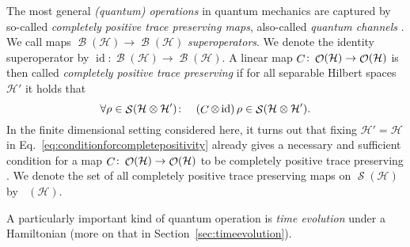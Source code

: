 \documentclass[a4paper,12pt,listof=totoc,index=totoc,bibliography=totoc,headsepline=false,headings=normal,BCOR16.153846mm,DIV12,headinclude,twoside,cleardoublepage=empty,numbers=noenddot,final]{scrreprt}
\theoremstyle{mystyle}
\numberwithin{equation}{section}
\numberwithin{figure}{section}
\numberwithin{lemma}{section}
\numberwithin{theorem}{section}
\numberwithin{corollary}{section}
\numberwithin{definition}{section}
\numberwithin{conjecture}{section}
\numberwithin{observation}{section}
\newcommand{\+}{\mkern2mu}
\newcommand{\texteqref}[1]{Eq.~\eqref{#1}}
\newcommand{\oftype}{\colon}
\newcommand{\itholds}{\colon\mathchoice{\quad}{}{}{}}
\DeclareMathOperator{\1}{\mathds{1}}
\DeclareMathOperator{\id}{\mathrm{id}}
\DeclareMathOperator{\Bop}{\mathcal{B}}
\DeclareMathOperator{\Obs}{\mathcal{O}}
\DeclareMathOperator{\Qst}{\mathcal{S}}
\DeclareMathOperator{\Qch}{\mathcal{T^+}}
\DeclareMathOperator{\Chann}{\mathnormal{C}}
\newcommand{\mc}[1]{\mathcal{#1}}
\newcommand{\mcH}{\mc{H}}
\begin{document}
The most general \emph{(quantum) operations} in quantum mechanics are captured by so-called \emph{completely positive trace preserving maps}, also-called \emph{quantum channels} \cite{nielsenchuang}.
We call maps $\Bop(\mcH)\to\Bop(\mcH)$ \emph{superoperators}.
We denote the identity superoperator by $\id\oftype\Bop(\mcH)\to\Bop(\mcH)$.
A linear map $\Chann\oftype\Obs(\mcH)\to\Obs(\mcH)$ is then called \emph{completely positive trace preserving} if for all separable Hilbert spaces $\mcH'$ it holds that
\begin{equation} \label{eq:conditionforcompletepositivity}
  \forall \rho \in \Qst(\mcH \otimes \mcH')\itholds (\Chann \otimes \id)\,\rho \in \Qst(\mcH \otimes \mcH') .
\end{equation}
In the finite dimensional setting considered here, it turns out that fixing $\mcH' = \mcH$ in \texteqref{eq:conditionforcompletepositivity} already gives a necessary and sufficient condition for a map $\Chann\oftype\Obs(\mcH)\to\Obs(\mcH)$ to be completely positive trace preserving \cite{nielsenchuang}.
We denote the set of all completely positive trace preserving maps on $\Qst(\mcH)$ by $\Qch(\mcH)$.

A particularly important kind of quantum operation is \emph{time evolution} under a Hamiltonian (more on that in Section~\ref{sec:timeevolution}).
\end{document}
